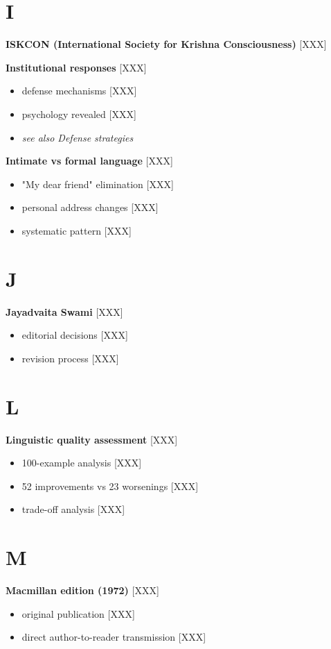 \documentclass[11pt,twoside]{book}
\begin{document}
\section*{I}
\label{sec:orgcc7c491}

\textbf{\textbf{ISKCON (International Society for Krishna Consciousness)}} {[}XXX]

\textbf{\textbf{Institutional responses}} {[}XXX]
\begin{itemize}
\item defense mechanisms [XXX]
\item psychology revealed [XXX]
\item \emph{see also Defense strategies}
\end{itemize}

\textbf{\textbf{Intimate vs formal language}} {[}XXX]
\begin{itemize}
\item "My dear friend" elimination [XXX]
\item personal address changes [XXX]
\item systematic pattern [XXX]
\end{itemize}
\section*{J}
\label{sec:orge868fb0}

\textbf{\textbf{Jayadvaita Swami}} {[}XXX]
\begin{itemize}
\item editorial decisions [XXX]
\item revision process [XXX]
\end{itemize}
\section*{L}
\label{sec:org0fc3b3a}

\textbf{\textbf{Linguistic quality assessment}} {[}XXX]
\begin{itemize}
\item 100-example analysis [XXX]
\item 52 improvements vs 23 worsenings [XXX]
\item trade-off analysis [XXX]
\end{itemize}
\section*{M}
\label{sec:orgb4baa50}

\textbf{\textbf{Macmillan edition (1972)}} {[}XXX]
\begin{itemize}
\item original publication [XXX]
\item direct author-to-reader transmission [XXX]
\end{itemize}
\end{document}
